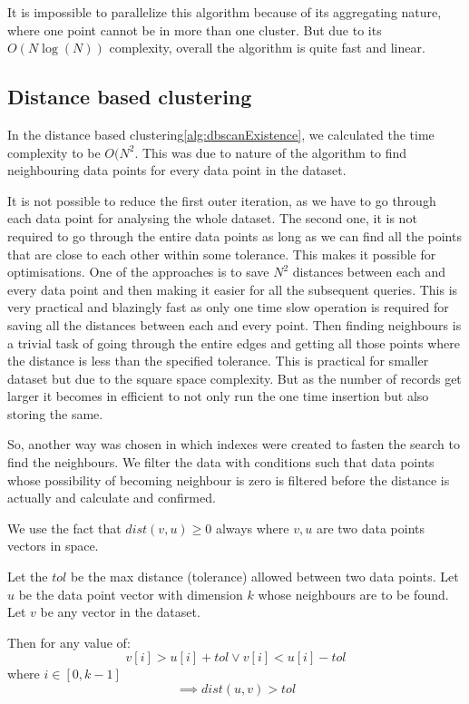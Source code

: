 It is impossible to parallelize this algorithm because of its aggregating nature, where one point cannot be in more than one cluster. But due to its \(O(N\log(N))\) complexity, overall the algorithm is quite fast and linear.

\subsection{Distance based clustering}

In the distance based clustering\ref{alg:dbscanExistence}, we calculated the time complexity to be \(O(N^2\). This was due to nature of the algorithm to find neighbouring data points for every data point in the dataset. 

It is not possible to reduce the first outer iteration, as we have to go through each data point for analysing the whole dataset. The second one, it is not required to go through the entire data points as long as we can find all the points that are close to each other within some tolerance. This makes it possible for optimisations. One of the approaches is to save \(N^2\) distances between each and every data point and then making it easier for all the subsequent queries. This is very practical and blazingly fast as only one time slow operation is required for saving all the distances between each and every point. Then finding neighbours is a trivial task of going through the entire edges and getting all those points where the distance is less than the specified tolerance. This is practical for smaller dataset but due to the square space complexity. But as the number of records get larger it becomes in efficient to not only run the one time insertion but also storing the same.

So, another way was chosen in which indexes were created to fasten the search to find the neighbours. We filter the data with conditions such that data points whose possibility of becoming neighbour is zero is filtered before the distance is actually and calculate and confirmed.

We use the fact that \(dist(v, u) \geq 0\) always where \(v, u\) are two data points vectors in space. 

Let the \(tol\) be the max distance (tolerance) allowed between two data points. 
Let \(u\) be the data point vector with dimension \(k\) whose neighbours are to be found.
Let \(v\) be any vector in the dataset.

Then for any value of:
\[v[i] > u[i] + tol \vee v[i] < u[i] - tol\] where \(i \in [0, k-1]\)
\[\implies dist(u, v) > tol\]

